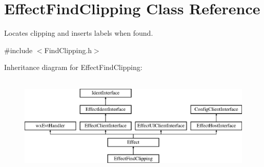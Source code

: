 \hypertarget{class_effect_find_clipping}{}\section{Effect\+Find\+Clipping Class Reference}
\label{class_effect_find_clipping}


Locates clipping and inserts labels when found.  




{\ttfamily \#include $<$Find\+Clipping.\+h$>$}

Inheritance diagram for Effect\+Find\+Clipping\+:\begin{figure}[H]
\begin{center}
\leavevmode
\includegraphics[height=4.794520cm]{class_effect_find_clipping}
\end{center}
\end{figure}
